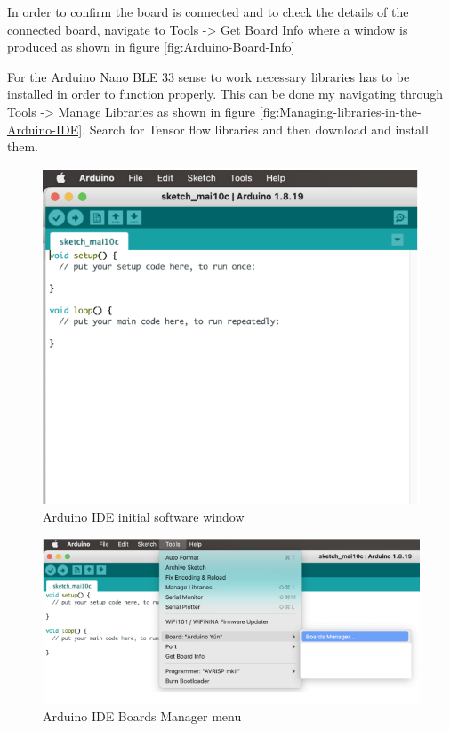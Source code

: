 In order to confirm the board is connected and to check the details of the connected board, navigate to Tools -> Get Board Info where a window is produced as shown in
figure \ref{fig:Arduino-Board-Info}

For the Arduino Nano BLE 33 sense to work necessary libraries has to be installed in order to function properly. This can be done my navigating through Tools -> Manage Libraries as shown in figure \ref{fig:Managing-libraries-in-the-Arduino-IDE}. Search for Tensor flow libraries and then download and install them.

\begin{figure}[h!]
	\centering
	\includegraphics[width=1.0\textwidth]{Images/Deployment/Arduino-IDE-initial-software-window}
	\caption{Arduino IDE initial software window} \label{fig:Arduino-IDE-initial-software-window}
\end{figure}

\begin{figure}[h!]
	\centering
	\includegraphics[width=1.0\textwidth]{Images/Deployment/Arduino-IDE-Boards-Manager-menu}
	\caption{Arduino IDE Boards Manager menu} \label{fig:Arduino-IDE-Boards-Manager-menu}
\end{figure}

